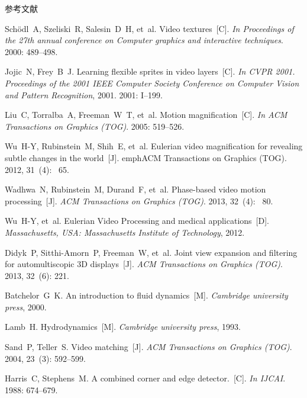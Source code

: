 \documentclass[xcolor=svgnames,serif,table]{beamer}
\begin{document}
\begin{frame}[allowframebreaks]{参考文献}
\begin{thebibliography}{10}
Sch{\"o}dl~A, Szeliski~R, Salesin~D~H, et~al.
\newblock Video textures~[C].
\newblock \emph{In Proceedings of the 27th annual conference on Computer graphics and
  interactive techniques}.
2000:  489--498.

Jojic~N, Frey~B~J.
\newblock Learning flexible sprites in video layers~[C].
\newblock \emph{In CVPR 2001. Proceedings of the 2001 IEEE Computer Society Conference on
  Computer Vision and Pattern Recognition}, 2001.
2001:  I--199.

Liu~C, Torralba~A, Freeman~W~T, et~al.
\newblock Motion magnification~[C].
\newblock \emph{In ACM Transactions on Graphics (TOG)}. 2005:  519--526.

Wu~H-Y, Rubinstein~M, Shih~E, et~al.
\newblock Eulerian video magnification for revealing subtle changes in the world~[J].
\newblock emph{ACM Transactions on Graphics (TOG)}. 2012, 31~(4): ~65.

Wadhwa~N, Rubinstein~M, Durand~F, et~al.
\newblock Phase-based video motion processing~[J].
\newblock \emph{ACM Transactions on Graphics (TOG)}. 2013, 32~(4): ~80.

{\beamertemplatebookbibitems
{}
Wu~H-Y, et~al.
\newblock Eulerian Video Processing and medical applications~[D].
\newblock \emph{Massachusetts, USA: Massachusetts Institute of Technology}, 2012.}

Didyk~P, Sitthi-Amorn~P, Freeman~W, et~al.
\newblock Joint view expansion and filtering for automultiscopic 3D displays~[J].
\newblock \emph{ACM Transactions on Graphics (TOG)}.
2013, 32~(6):  221.

{\beamertemplatebookbibitems
{}
Batchelor~G~K.
\newblock An introduction to fluid dynamics~[M].
\newblock \emph{Cambridge university press}, 2000.}

{\beamertemplatebookbibitems
{}
Lamb~H.
\newblock Hydrodynamics~[M].
\newblock \emph{Cambridge university press}, 1993.}

Sand~P, Teller~S.
\newblock Video matching~[J].
\newblock \emph{ACM Transactions on Graphics (TOG)}.
2004, 23~(3):  592--599.

Harris~C, Stephens~M.
\newblock A combined corner and edge detector.~[C].
\newblock \emph{In IJCAI}.
1988:  674--679.


\end{thebibliography}
\end{frame}
\end{document}

